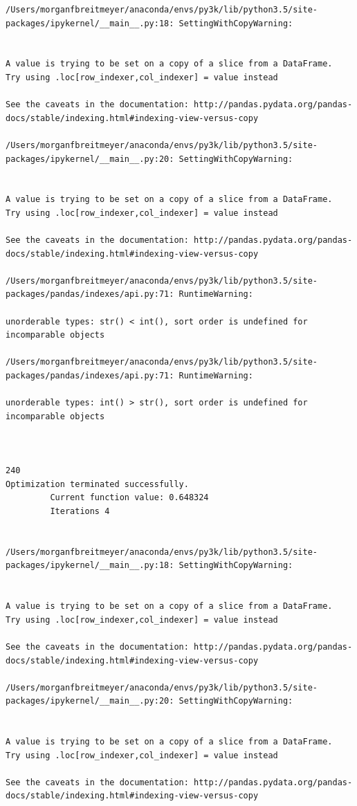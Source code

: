 \begin{lstlisting}
/Users/morganfbreitmeyer/anaconda/envs/py3k/lib/python3.5/site-packages/ipykernel/__main__.py:18: SettingWithCopyWarning:


A value is trying to be set on a copy of a slice from a DataFrame.
Try using .loc[row_indexer,col_indexer] = value instead

See the caveats in the documentation: http://pandas.pydata.org/pandas-docs/stable/indexing.html#indexing-view-versus-copy

/Users/morganfbreitmeyer/anaconda/envs/py3k/lib/python3.5/site-packages/ipykernel/__main__.py:20: SettingWithCopyWarning:


A value is trying to be set on a copy of a slice from a DataFrame.
Try using .loc[row_indexer,col_indexer] = value instead

See the caveats in the documentation: http://pandas.pydata.org/pandas-docs/stable/indexing.html#indexing-view-versus-copy

/Users/morganfbreitmeyer/anaconda/envs/py3k/lib/python3.5/site-packages/pandas/indexes/api.py:71: RuntimeWarning:

unorderable types: str() < int(), sort order is undefined for incomparable objects

/Users/morganfbreitmeyer/anaconda/envs/py3k/lib/python3.5/site-packages/pandas/indexes/api.py:71: RuntimeWarning:

unorderable types: int() > str(), sort order is undefined for incomparable objects



240
Optimization terminated successfully.
         Current function value: 0.648324
         Iterations 4


/Users/morganfbreitmeyer/anaconda/envs/py3k/lib/python3.5/site-packages/ipykernel/__main__.py:18: SettingWithCopyWarning:


A value is trying to be set on a copy of a slice from a DataFrame.
Try using .loc[row_indexer,col_indexer] = value instead

See the caveats in the documentation: http://pandas.pydata.org/pandas-docs/stable/indexing.html#indexing-view-versus-copy

/Users/morganfbreitmeyer/anaconda/envs/py3k/lib/python3.5/site-packages/ipykernel/__main__.py:20: SettingWithCopyWarning:


A value is trying to be set on a copy of a slice from a DataFrame.
Try using .loc[row_indexer,col_indexer] = value instead

See the caveats in the documentation: http://pandas.pydata.org/pandas-docs/stable/indexing.html#indexing-view-versus-copy


\end{lstlisting}
